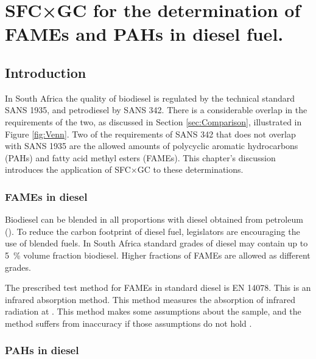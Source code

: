 
\begin{savequote}[\quotewidth]

\end{savequote}

\chapter{SFC×GC for the determination of FAMEs and PAHs in diesel fuel.} %
\label{Chapter7} %

\section{Introduction}

In South Africa the quality of biodiesel is regulated by the technical standard
SANS 1935, and petrodiesel by SANS 342. There is a considerable overlap in the
requirements of the two, as discussed in Section \ref{sec:Comparison},
illustrated in Figure \ref{fig:Venn}. Two of the requirements of SANS 342 that
does not overlap with SANS 1935 are the allowed amounts of polycyclic aromatic
hydrocarbons (PAHs) and fatty acid methyl esters (FAMEs). This chapter's
discussion introduces the application of SFC×GC to these determinations. 

\subsection{FAMEs in diesel}

Biodiesel can be blended in all proportions with diesel obtained from petroleum
(). To reduce the carbon footprint of diesel fuel,
legislators are encouraging the use of blended fuels. In South Africa standard
grades of diesel may contain up to \SI{5}{\percent} volume fraction biodiesel. 
Higher fractions of FAMEs are allowed as different grades.

The prescribed test method for FAMEs in standard diesel is EN 14078. This is an infrared absorption method. 
This method measures the absorption of infrared radiation at . This method makes some assumptions about the sample, 
and the method suffers from inaccuracy if those assumptions do not hold \autocite{Pinho2014}. 

\subsection{PAHs in diesel} 

